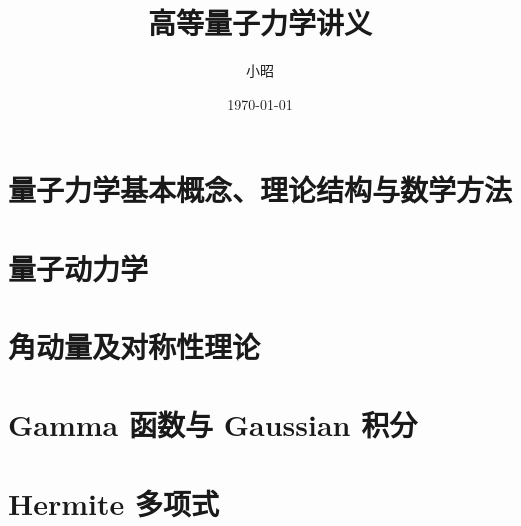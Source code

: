 \documentclass[UTF8,12pt,a4paper,openany,fontset=fandol]{ctexbook}
\title{高等量子力学讲义}
\author{小昭}
\date{\today}
\begin{document}
\frontmatter
\maketitle
\lecturetableofcontents
\mainmatter
\chapter{量子力学基本概念、理论结构与数学方法}





\chapter{量子动力学}










\chapter{角动量及对称性理论}





\appendix
\chapter{Gamma 函数与 Gaussian 积分}

\chapter{Hermite 多项式}

\end{document}
